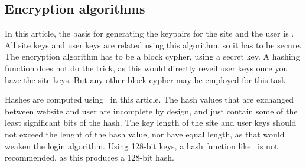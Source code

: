 \subsection{Encryption algorithms}
In this article,
the basis for generating the keypairs for the site and the user is \AES.
All site keys and user keys are related using this algorithm,
so it has to be secure.
The encryption algorithm has to be a block cypher,
using a secret key.
A hashing function does not do the trick,
as this would directly reveil user keys once you have the site keys.
But any other block cypher may be employed for this task.
\par
Hashes are computed using \SHA\ in this article.
The hash values that are exchanged between website and user are incomplete by design,
and just contain some of the least significant bits of the hash.
The key length of the site and user keys
should not exceed the lenght of the hash value,
nor have equal length,
as that would weaken the login algorithm.
Using 128-bit keys, a hash function like \MDV\ is not recommended, as this produces a 128-bit hash.
\par
